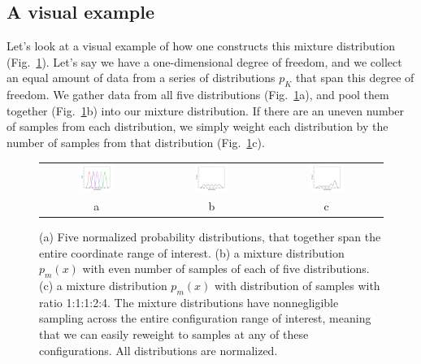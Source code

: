\documentclass[aps,pre,twocolumn,superscriptaddress]{revtex4-1}
\begin{document}
\subsection{A visual example}

Let's look at a visual example of how one constructs this mixture
distribution (Fig.~\ref{figure:mixture}).  Let's say we have a
one-dimensional degree of freedom, and we collect an equal amount of
data from a series of distributions $p_K$ that span this degree of
freedom.  We gather data from all five distributions
(Fig.~\ref{figure:mixture}a), and pool them together
(Fig.~\ref{figure:mixture}b) into our mixture distribution. If there
are an uneven number of samples from each distribution, we simply
weight each distribution by the number of samples from that
distribution (Fig.~\ref{figure:mixture}c).

\begin{figure}
\begin{tabular}{ccc}
\includegraphics[width=0.33\textwidth]{constN_numf4}&
\includegraphics[width=0.33\textwidth]{constN_mix.pdf}&
\includegraphics[width=0.33\textwidth]{varN_mix.pdf} \\
a & b & c
\end{tabular}
\caption{(a) Five normalized probability distributions, that together
  span the entire coordinate range of interest. (b) a mixture
  distribution $p_m(x)$ with even number of samples of each of five
  distributions. (c) a mixture distribution $p_m(x)$ with distribution
  of samples with ratio 1:1:1:2:4. The mixture distributions have
  nonnegligible sampling across the entire configuration range of
  interest, meaning that we can easily reweight to samples at any of
  these configurations. All distributions are normalized.}
\label{figure:mixture}
\end{figure}
\end{document}

